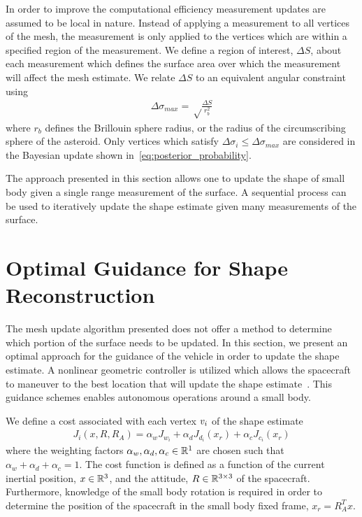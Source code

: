 \documentclass[journal]{new-aiaa}
\begin{document}
In order to improve the computational efficiency measurement updates are assumed to be local in nature.
Instead of applying a measurement to all vertices of the mesh, the measurement is only applied to the vertices which are within a specified region of the measurement. 
We define a region of interest, \( \Delta S \), about each measurement which defines the surface area over which the measurement will affect the mesh estimate.
We relate \( \Delta S \) to an equivalent angular constraint using
\begin{align}\label{eq:region_of_interest}
    \Delta \sigma_{max} = \sqrt \frac{\Delta S}{r_b^2}
\end{align}
where \( r_b \) defines the Brillouin  sphere radius, or the radius of the circumscribing sphere of the asteroid.
Only vertices which satisfy \( \Delta \sigma_i \leq \Delta \sigma_{max} \) are considered in the Bayesian update shown in~\cref{eq:posterior_probability}.

The approach presented in this section allows one to update the shape of small body given a single range measurement of the surface.
A sequential process can be used to iteratively update the shape estimate given many measurements of the surface. 

\section{Optimal Guidance for Shape Reconstruction}\label{sec:explore_asteroid}

The mesh update algorithm presented does not offer a method to determine which portion of the surface needs to be updated. 
In this section, we present an optimal approach for the guidance of the vehicle in order to update the shape estimate.
A nonlinear geometric controller is utilized which allows the spacecraft to maneuver to the best location that will update the shape estimate~\cite{kulumani2017b}.
This guidance schemes enables autonomous operations around a small body.

We define a cost associated with each vertex \( v_i \) of the shape estimate
\begin{align}\label{eq:explore_cost}
    J_i (x, R, R_A) = \alpha_w J_{w_i} + \alpha_d J_{d_i}(x_r) + \alpha_c J_{c_i}(x_r)
\end{align}
where the weighting factors \( \alpha_w, \alpha_d, \alpha_c \in \mathbb{R}^1 \) are chosen such that \( \alpha_w + \alpha_d + \alpha_c = 1 \).
The cost function is defined as a function of the current inertial position, \( x \in \mathbb{R}^3 \), and the attitude, \( R \in \mathbb{R}^{3\times3}\) of the spacecraft.
Furthermore, knowledge of the small body rotation is required in order to determine the position of the spacecraft in the small body fixed frame, \( x_r = R_A^T x\).
\end{document}
